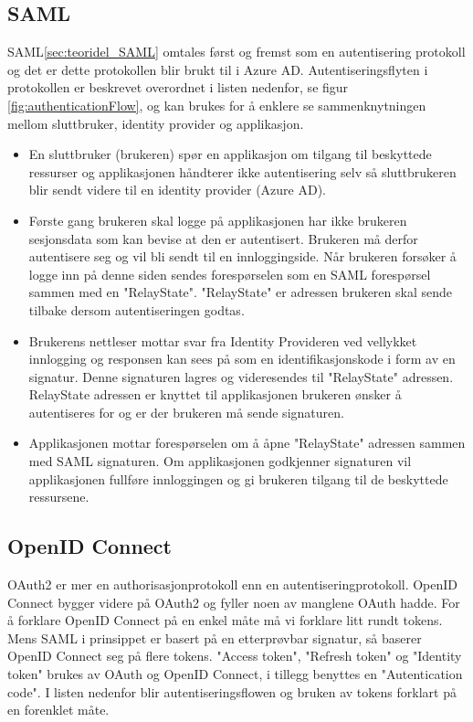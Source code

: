 \subsection*{SAML}
SAML\ref{sec:teoridel_SAML} omtales først og fremst som en autentisering protokoll og det er dette protokollen blir brukt til i Azure AD\cite{AadSamlSingelSignIn}. Autentiseringsflyten i protokollen er beskrevet overordnet i listen nedenfor, se figur \ref{fig:authenticationFlow}, og kan brukes for å enklere se sammenknytningen mellom sluttbruker, identity provider og applikasjon.
\\
\begin{itemize}
\item En sluttbruker (brukeren) spør en applikasjon om tilgang til beskyttede ressurser og applikasjonen håndterer ikke autentisering selv så sluttbrukeren blir sendt videre til en identity provider (Azure AD). 
\item Første gang brukeren skal logge på applikasjonen har ikke brukeren sesjonsdata som kan bevise at den er autentisert. Brukeren må derfor autentisere seg og vil bli sendt til en innloggingside. Når brukeren forsøker å logge inn på denne siden sendes forespørselen som en SAML forespørsel sammen med en "RelayState". "RelayState" er adressen brukeren skal sende tilbake dersom autentiseringen godtas. 
\item Brukerens nettleser mottar svar fra Identity Provideren ved vellykket innlogging og responsen kan sees på som en identifikasjonskode i form av en signatur. Denne signaturen lagres og videresendes til "RelayState" adressen. RelayState adressen er knyttet til applikasjonen brukeren ønsker å autentiseres for og er der brukeren må sende signaturen.
\item Applikasjonen mottar forespørselen om å åpne "RelayState" adressen sammen med SAML signaturen. Om applikasjonen godkjenner signaturen vil applikasjonen fullføre innloggingen og gi brukeren tilgang til de beskyttede ressursene.
\end{itemize}

\subsection*{OpenID Connect}
OAuth2 er mer en authorisasjonprotokoll enn en autentiseringprotokoll. OpenID Connect bygger videre på OAuth2 og fyller noen av manglene OAuth hadde. For å forklare OpenID Connect på en enkel måte må vi forklare litt rundt tokens. Mens SAML i prinsippet er basert på en etterprøvbar signatur, så baserer OpenID Connect seg på flere tokens. "Access token", "Refresh token" og "Identity token" brukes av OAuth og OpenID Connect, i tillegg benyttes en "Autentication code". I listen nedenfor blir autentiseringsflowen og bruken av tokens forklart på en forenklet måte. 

